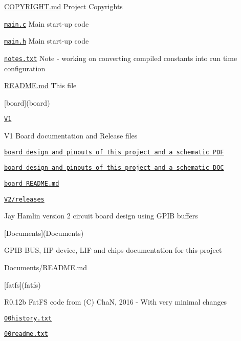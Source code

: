 \begin{DoxyItemize}
\item \hyperlink{COPYRIGHT_8md}{C\+O\+P\+Y\+R\+I\+G\+HT.md} Project Copyrights
\item \href{main.c}{\tt main.\+c} Main start-\/up code
\item \href{main.h}{\tt main.\+h} Main start-\/up code
\item \href{notes.txt}{\tt notes.\+txt} Note -\/ working on converting compiled constants into run time configuration
\item \hyperlink{md_README}{R\+E\+A\+D\+ME.md} This file
\item \mbox{[}board\mbox{]}(board)
\begin{DoxyItemize}
\item \href{board/V1}{\tt V1}
\begin{DoxyItemize}
\item V1 Board documentation and Release files
\item \href{board/V1/HP85Disk.pdf}{\tt board design and pinouts of this project and a schematic P\+DF}
\item \href{board/V1//HP85Disk.doc}{\tt board design and pinouts of this project and a schematic D\+OC}
\item \href{board/V1/HP85Disk.doc}{\tt board R\+E\+A\+D\+M\+E.\+md}
\end{DoxyItemize}
\item \href{V2/releses}{\tt V2/releases}
\begin{DoxyItemize}
\item Jay Hamlin version 2 circuit board design using G\+P\+IB buffers
\end{DoxyItemize}
\end{DoxyItemize}
\item \mbox{[}Documents\mbox{]}(Documents)
\item G\+P\+IB B\+US, HP device, L\+IF and chips documentation for this project
\begin{DoxyItemize}
\item Documents/\+R\+E\+A\+D\+ME.md
\end{DoxyItemize}
\item \mbox{[}fatfs\mbox{]}(fatfs)
\begin{DoxyItemize}
\item R0.\+12b Fat\+FS code from (C) ChaN, 2016 -\/ With very minimal changes
\item \href{fatfs/00history.txt}{\tt 00history.\+txt}
\item \href{fatfs/00readme.txt}{\tt 00readme.\+txt}

\end{DoxyItemize}
\end{DoxyItemize}
